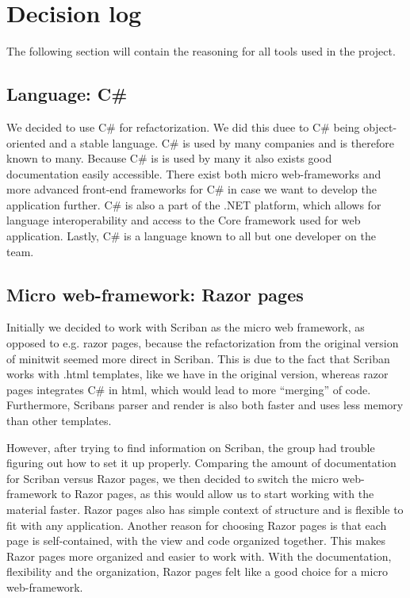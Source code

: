 \section{Decision log}
The following section will contain the reasoning for all tools used in the project.

\subsection{Language: C\#}
We decided to use C\# for refactorization. We did this duee to C\# being object-oriented and a stable language. C\# is used by many companies and is therefore known to many. Because C\# is is used by many it also exists good documentation easily accessible. There exist both micro web-frameworks and more advanced front-end frameworks for C\# in case we want to develop the application further. C\# is also a part of the .NET platform, which allows for language interoperability and access to the Core framework used for web application. Lastly, C\# is a language known to all but one developer on the team.

\subsection{Micro web-framework: Razor pages}
Initially we decided to work with Scriban as the micro web framework, as opposed to e.g. razor pages, because the refactorization from the original version of minitwit seemed more direct in Scriban. This is due to the fact that Scriban works with .html templates, like we have in the original version, whereas razor pages integrates C\# in html, which would lead to more “merging” of code. Furthermore, Scribans parser and render is also both faster and uses less memory than other templates. 

However, after trying to find information on Scriban, the group had trouble figuring out how to set it up properly. Comparing the amount of documentation for Scriban versus Razor pages, we then decided to switch the micro web-framework to Razor pages, as this would allow us to start working with the material faster. Razor pages also has simple context of structure and is flexible to fit with any application. Another reason for choosing Razor pages is that each page is self-contained, with the view and code organized together.  This makes Razor pages more organized and easier to work with. With the documentation, flexibility and the organization, Razor pages felt like a good choice for a micro web-framework. 

